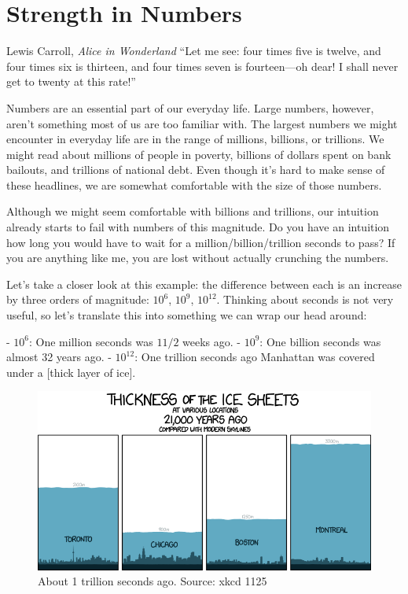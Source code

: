 \chapter{Strength in Numbers}
\label{les:15}

\begin{chapquote}{Lewis Carroll, \textit{Alice in Wonderland}}
``Let me see: four times five is twelve, and four times six is thirteen, and
four times seven is fourteen—oh dear! I shall never get to twenty at this
rate!''
\end{chapquote}

Numbers are an essential part of our everyday life. Large numbers,
however, aren't something most of us are too familiar with. The largest
numbers we might encounter in everyday life are in the range of
millions, billions, or trillions. We might read about millions of people
in poverty, billions of dollars spent on bank bailouts, and trillions of
national debt. Even though it's hard to make sense of these headlines,
we are somewhat comfortable with the size of those numbers.

Although we might seem comfortable with billions and trillions, our
intuition already starts to fail with numbers of this magnitude. Do you
have an intuition how long you would have to wait for a
million/billion/trillion seconds to pass? If you are anything like me,
you are lost without actually crunching the numbers.

Let's take a closer look at this example: the difference between each is an
increase by three orders of magnitude: $10^6$, $10^9$, $10^{12}$. Thinking about
seconds is not very useful, so let's translate this into something we can wrap
our head around:

-  $10^6$: One million seconds was $1 1/2$ weeks ago.
-  $10^9$: One billion seconds was almost 32 years ago.
-  $10^{12}$: One trillion seconds ago Manhattan was covered under a [thick
    layer of ice].

\begin{figure}
  \includegraphics{assets/images/xkcd-1125.png}
  \caption{About 1 trillion seconds ago. Source: xkcd 1125}
  \label{fig:xkcd-1125}
\end{figure}

